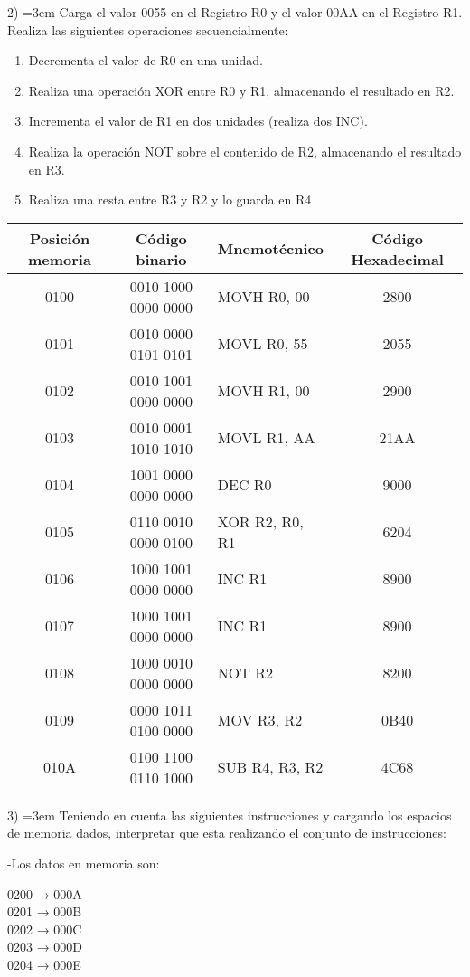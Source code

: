 \documentclass[a4paper,12pt]{article}
\begin{document}
	2) \hangindent=3em Carga el valor 0055 en el Registro R0 y el valor 00AA en el Registro R1. Realiza las
	siguientes operaciones secuencialmente:
	\begin{enumerate}
		\item Decrementa el valor de R0 en una unidad.
		\item Realiza una operación XOR entre R0 y R1, almacenando el resultado en R2.
		\item Incrementa el valor de R1 en dos unidades (realiza dos INC).
		\item Realiza la operación NOT sobre el contenido de R2, almacenando el resultado en R3.
		\item Realiza una resta entre R3 y R2 y lo guarda en R4
	\end{enumerate}
	
	\begin{tabular}{c|c|l|c}
		\textbf{Posición memoria} & \textbf{Código binario} & \textbf{Mnemotécnico} & \textbf{Código Hexadecimal}\\
		\hline
		0100 & 0010 1000 0000 0000 & MOVH R0, 00 & 2800 \\
		0101 & 0010 0000 0101 0101 & MOVL R0, 55 & 2055 \\
		0102 & 0010 1001 0000 0000 & MOVH R1, 00 & 2900 \\
		0103 & 0010 0001 1010 1010 & MOVL R1, AA & 21AA \\
		0104 & 1001 0000 0000 0000 & DEC R0 & 9000 \\
		0105 & 0110 0010 0000 0100 & XOR R2, R0, R1 & 6204 \\
		0106 & 1000 1001 0000 0000 & INC R1 & 8900 \\
		0107 & 1000 1001 0000 0000 & INC R1 & 8900 \\
		0108 & 1000 0010 0000 0000 & NOT R2 & 8200 \\
		0109 & 0000 1011 0100 0000 & MOV R3, R2 & 0B40 \\
		010A & 0100 1100 0110 1000 & SUB R4, R3, R2 & 4C68 \\
	\end{tabular}
	
	\vspace{2cm}
	
	3) \hangindent=3em Teniendo en cuenta las siguientes instrucciones y cargando los espacios de
	memoria dados, interpretar que esta realizando el conjunto de instrucciones: \newline
	
	\hspace{1cm}-Los datos en memoria son:
	\begin{flushleft}
		\hspace*{3cm}0200 → 000A \\
		\hspace*{3cm}0201 → 000B \\
		\hspace*{3cm}0202 → 000C \\
		\hspace*{3cm}0203 → 000D \\
		\hspace*{3cm}0204 → 000E \\
	\end{flushleft}
	
\end{document}
